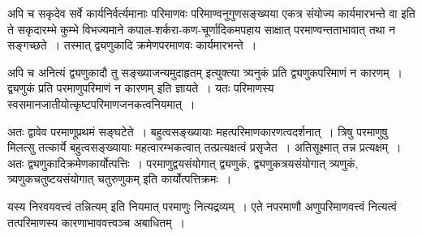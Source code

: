 {अपि च सकृदेव सर्वे कार्यनिर्वर्त्यमानाः परिमाणवः परिमाण्वनुगुणसङ्ख्यया एकत्र संयोज्य कार्यमारभन्ते वा इति ते सकृदारम्भे कुम्भे विभज्यमाने कपाल-शर्करा-कण-चूर्णादिकमपहाय साक्षात् परमाण्वन्तताभावात् तथा न सङ्गच्छते~। तस्मात् द्व्यणुकादि क्रमेणपरमाणवः कार्यमारभन्ते~। 

अपि च अनित्यं द्व्यणुकादौ तु सङ्ख्याजन्यमुदाहृतम् इत्युक्त्या त्र्यनुकं प्रति द्व्यणुकपरिमाणं न कारणम्~। द्व्यणुकं प्रति परमाणुपरिमाणं न कारणम् इति ज्ञायते~। यतः परिमाणस्य स्वसमानजातीयोत्कृष्टपरिमाणजनकत्वनियमात्~। 

अतः द्वावेव परमाणूप्रथमं सङ्घटेते~। बहुत्वसङ्ख्यायाः महत्परिमाणकारणत्वदर्शनात्~। त्रिषु परमाणुषु मिलत्सु तत्कार्ये बहुत्वसङ्ख्यायाः महत्वारम्भकत्वात् तत्प्रत्यक्षत्वं प्रसृजेत~। अतिसूक्ष्मात् तन्न प्रत्यक्षम्~। अतः द्व्यणुकादिक्रमेणकार्योत्पत्तिः~। परमाणुद्वयसंयोगात् द्व्यणुकं, द्व्यणुकत्रयसंयोगात् त्र्यणुकं, त्र्यणुकचतुष्टयसंयोगात् चतुरुणुकम् इति कार्योत्पत्तिक्रमः~। 

यस्य निरवयवत्त्वं तन्नित्यम् इति नियमात् परमाणुः नित्यद्रव्यम्~। एते नपरमाणौ अणुपरिमाणवत्त्वं नित्यत्वं तत्परिमाणस्य कारणाभाववत्त्वञ्च अबाधितम्~। 

\articleend
}
